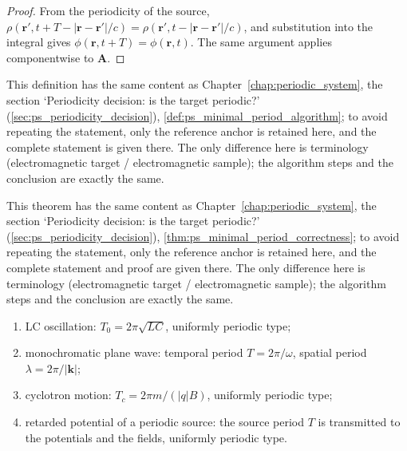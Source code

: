 \begin{proof}
From the periodicity of the source, $\rho(\mathbf r',t+T-|\mathbf r-\mathbf r'|/c)=\rho(\mathbf r',t-|\mathbf r-\mathbf r'|/c)$, and substitution into the integral gives $\phi(\mathbf r,t+T)=\phi(\mathbf r,t)$. The same argument applies componentwise to $\mathbf A$.
\end{proof}

\begin{definition}\label{def:em_minimal_period_algorithm}
This definition has the same content as Chapter~\ref{chap:periodic_system}, the section `Periodicity decision: is the target periodic?' (\cref{sec:ps_periodicity_decision}), \cref{def:ps_minimal_period_algorithm}; to avoid repeating the statement, only the reference anchor is retained here, and the complete statement is given there. The only difference here is terminology (electromagnetic target / electromagnetic sample); the algorithm steps and the conclusion are exactly the same.
\end{definition}

\begin{theorem}\label{thm:em_minimal_period_correctness}
This theorem has the same content as Chapter~\ref{chap:periodic_system}, the section `Periodicity decision: is the target periodic?' (\cref{sec:ps_periodicity_decision}), \cref{thm:ps_minimal_period_correctness}; to avoid repeating the statement, only the reference anchor is retained here, and the complete statement and proof are given there. The only difference here is terminology (electromagnetic target / electromagnetic sample); the algorithm steps and the conclusion are exactly the same.
\end{theorem}

\begin{example}\label{ex:em_periodic_examples}
\begin{enumerate}[label=(\roman*)]
    \item LC oscillation: $T_0=2\pi\sqrt{LC}$, uniformly periodic type;
    \item monochromatic plane wave: temporal period $T=2\pi/\omega$, spatial period $\lambda=2\pi/|\mathbf k|$;
    \item cyclotron motion: $T_c=2\pi m/(|q|B)$, uniformly periodic type;
    \item retarded potential of a periodic source: the source period $T$ is transmitted to the potentials and the fields, uniformly periodic type.
\end{enumerate}
\end{example}

